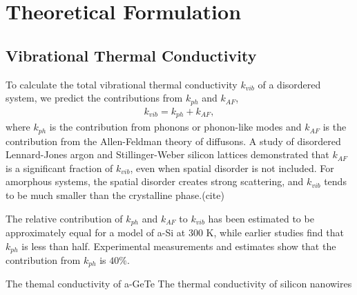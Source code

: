 \documentclass[aps,prb,twocolumn,superscriptaddress,footinbib,amsmath,amssymb,floatfix]{revtex4}
\begin{document}
\section{\label{S:Theory}Theoretical Formulation}

\subsection{\label{S:Theory:Thermal}Vibrational Thermal Conductivity}

To calculate the total vibrational thermal conductivity $k_{vib}$ of a 
disordered system, we predict 
the contributions from $k_{ph}$ and $k_{AF}$, 
\begin{equation}\label{EQ:kvib}
\begin{split}
k_{vib} = k_{ph} + k_{AF},
\end{split}
\end{equation}
where $k_{ph}$\cite{ashcroft_solid_1976,dove_introduction_1993,
ziman_electrons_2001} is the contribution from phonons or 
phonon-like modes and $k_{AF}$ is the contribution from the 
Allen-Feldman theory of diffusons.
\cite{feldman_thermal_1993}
A study of disordered Lennard-Jones argon and Stillinger-Weber silicon 
lattices demonstrated that $k_{AF}$ is a significant fraction of $k_{vib}$, 
even when spatial disorder is not included. 
For amorphous systems, the 
spatial disorder creates strong scattering, and $k_{vib}$ tends to be 
much smaller than the crystalline phase.(cite)  

The relative contribution of $k_{ph}$ and $k_{AF}$ to $k_{vib}$ 
has been estimated 
to be approximately equal for a model of a-Si  
at 300 K,\cite{he_heat_2011} 
while earlier studies find that $k_{ph}$ is less than half.
\cite{feldman_thermal_1993,feldman_numerical_1999} Experimental 
measurements and estimates show that the contribution from 
$k_{ph}$ is $40\%$.\cite{liu_high_2009} 

The themal conductivity of a-GeTe \cite{sosso_thermal_2012}
The thermal conductivity of silicon nanowires \cite{donadio_atomistic_2009}
\end{document}

